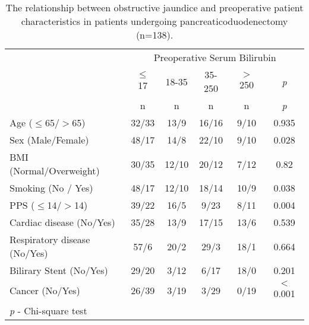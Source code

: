 \begin{table}[p]

\caption{The relationship  between obstructive jaundice and preoperative patient characteristics in patients undergoing pancreaticoduodenectomy (n=138).}
\label{table:cpet_oj_patient}
\centering\renewcommand{\arraystretch}{1.4} %
\setlength{\tabcolsep}{9pt} %


	\begin{tabular}{| l | c c c c c |}
		\hline
		                             & \multicolumn{5}{c|}{Preoperative Serum Bilirubin} \\
		                             & $\leq$ 17 & 18-35 & 35-250 & $>$ 250 & \textit{p} \\
		                             & n         & n     & n      & n       & \textit{p} \\ \hline
		Age ($\leq$65/$>$65)         & 32/33     & 13/9  & 16/16  & 9/10    & 0.935      \\
		Sex (Male/Female)            & 48/17     & 14/8  & 22/10  & 9/10    & 0.028      \\
		BMI (Normal/Overweight)      & 30/35     & 12/10 & 20/12  & 7/12    & 0.82       \\
		Smoking (No / Yes)           & 48/17     & 12/10 & 18/14  & 10/9    & 0.038      \\
		PPS ($\leq$14/$>$14)         & 39/22     & 16/5  & 9/23   & 8/11    & 0.004      \\
		Cardiac disease (No/Yes)     & 35/28     & 13/9  & 17/15  & 13/6    & 0.539      \\
		Respiratory disease (No/Yes) & 57/6      & 20/2  & 29/3   & 18/1    & 0.664      \\
		Bilirary Stent (No/Yes)      & 29/20     & 3/12  & 6/17   & 18/0    & 0.201      \\
		Cancer (No/Yes)              & 26/39     & 3/19  & 3/29   & 0/19    & $<$0.001   \\ \hline
		\multicolumn{6}{l}{\textit{p} - Chi-square test}
	\end{tabular}

\end{table}